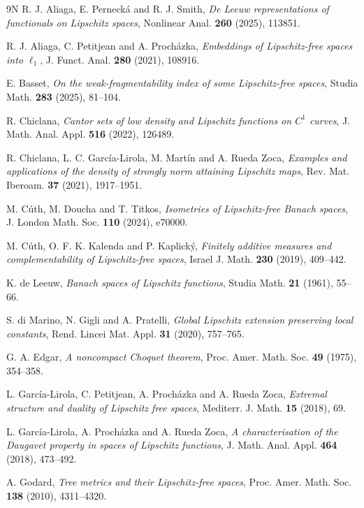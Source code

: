 \documentclass[a4paper,10pt]{amsart}
\theoremstyle{plain}
\theoremstyle{definition}
\theoremstyle{remark}
\begin{document}
\begin{thebibliography}{9N}
	R. J. Aliaga, E. Perneck\'a and R. J. Smith,
	\emph{De Leeuw representations of functionals on Lipschitz spaces},
	Nonlinear Anal. \textbf{260} (2025), 113851.

	R. J. Aliaga, C. Petitjean and A. Proch\'azka,
	\emph{Embeddings of Lipschitz-free spaces into {$\ell_1$}},
	J. Funct. Anal. \textbf{280} (2021), 108916.

	E. Basset,
	\emph{On the weak-fragmentability index of some Lipschitz-free spaces},
	Studia Math. \textbf{283} (2025), 81--104.

	R. Chiclana,
	\emph{Cantor sets of low density and Lipschitz functions on $C^1$ curves},
	J. Math. Anal. Appl. \textbf{516} (2022), 126489.

	R. Chiclana, L. C. Garc\'ia-Lirola, M. Mart\'in and A. Rueda Zoca,
	\emph{Examples and applications of the density of strongly norm attaining Lipschitz maps},
	Rev. Mat. Iberoam. \textbf{37} (2021), 1917--1951.

	M. C\'uth, M. Doucha and T. Titkos,
	\emph{Isometries of Lipschitz-free Banach spaces},
	J. London Math. Soc. \textbf{110} (2024), e70000.

	M. C\'uth, O. F. K. Kalenda and P. Kaplick\'y,
	\emph{Finitely additive measures and complementability of Lipschitz-free spaces},
	Israel J. Math. \textbf{230} (2019), 409--442.

	K. de Leeuw,
	\emph{Banach spaces of Lipschitz functions},
	Studia Math. \textbf{21} (1961), 55--66.

	S. di Marino, N. Gigli and A. Pratelli,
	\emph{Global Lipschitz extension preserving local constants},
	Rend. Lincei Mat. Appl. \textbf{31} (2020), 757--765.

	G. A. Edgar,
	\emph{A noncompact Choquet theorem},
	Proc. Amer. Math. Soc. \textbf{49} (1975), 354--358.

	L. Garc\'ia-Lirola, C. Petitjean, A. Proch\'azka and A. Rueda Zoca,
	\emph{Extremal structure and duality of Lipschitz free spaces},
	Mediterr. J. Math. \textbf{15} (2018), 69.

	L. Garc\'ia-Lirola, A. Proch\'azka and A. Rueda Zoca,
	\emph{A characterisation of the Daugavet property in spaces of Lipschitz functions},
	J. Math. Anal. Appl. \textbf{464} (2018), 473--492.

	A. Godard,
	\emph{Tree metrics and their Lipschitz-free spaces},
	Proc. Amer. Math. Soc. \textbf{138} (2010), 4311--4320.


\end{thebibliography}
\end{document}
